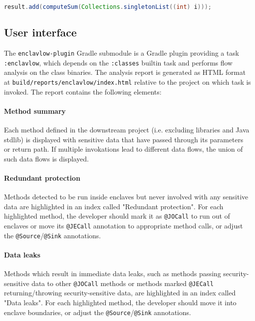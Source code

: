 \documentclass[a4paper, 12pt]{article}
\def\code#1{\colorbox{code}{\texttt{\footnotesize #1}}}
\begin{document}
\begin{lstlisting}[style=j, language=java, label={lst:computeSum},
caption={Example of leak through computeSum}]
result.add(computeSum(Collections.singletonList((int) i)));
\end{lstlisting}

\subsection{User interface}
The \code{enclavlow-plugin} Gradle submodule
is a Gradle plugin providing a task \code{:enclavlow},
which depends on the \code{:classes} builtin task
and performs flow analysis on the class binaries.
The analysis report is generated as HTML format at
\code{build/reports/enclavlow/index.html}
relative to the project on which task is invoked.
The report contains the following elements:

\paragraph{Method summary}
Each method defined in the downstream project (i.e. excluding libraries and Java stdlib)
is displayed with sensitive data that have passed through its parameters or return path.
If multiple invokations lead to different data flows,
the union of such data flows is displayed.

\paragraph{Redundant protection}
Methods detected to be run inside enclaves but never involved with any sensitive data
are highlighted in an index called "Redundant protection".
For each highlighted method, the developer
should mark it as \code{@JOCall} to run out of enclaves
or move its \code{@JECall} annotation to appropriate method calls,
or adjust the \code{@Source}/\code{@Sink} annotations.

\paragraph{Data leaks}
Methods which result in immediate data leaks,
such as methods passing security-sensitive data to other \code{@JOCall} methods
or methods marked \code{@JECall} returning/throwing security-sensitive data,
are highlighted in an index called "Data leaks".
For each highlighted method, the developer
should move it into enclave boundaries,
or adjust the \code{@Source}/\code{@Sink} annotations.
\end{document}
